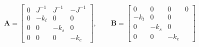         \begin{equation}
                \bm{A} =
                \begin{bmatrix}
                        0 & J^{-1}& J^{-1}& -J^{-1}\\
                        0 & -k_t & 0 & 0\\
                        0 & 0 & -k_s & 0\\
                        0 & 0 & 0 & -k_e
                \end{bmatrix}
                , \qquad \bm{B} =
                \begin{bmatrix}
                        0 & 0 & 0 & 0\\
                        -k_t & 0 & 0\\
                        0 & -k_s & 0\\
                        0 & 0 & -k_e
                \end{bmatrix}
        \end{equation}



